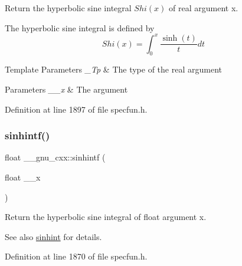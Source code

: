 Return the hyperbolic sine integral $ Shi(x) $ of real argument {\ttfamily x}.

The hyperbolic sine integral is defined by \[ Shi(x) = \int_0^x \frac{\sinh(t)}{t}dt \]


\begin{DoxyTemplParams}{Template Parameters}
{\em \+\_\+\+Tp} & The type of the real argument \\
\hline
\end{DoxyTemplParams}

\begin{DoxyParams}{Parameters}
{\em \+\_\+\+\_\+x} & The argument \\
\hline
\end{DoxyParams}


Definition at line 1897 of file specfun.\+h.

\mbox{\label{group__mathsf__gnu_ga375ca3ceb1eafd678e298d0aea4bb3e6}} 
\subsubsection{\texorpdfstring{sinhintf()}{sinhintf()}}
{\footnotesize\ttfamily float \+\_\+\+\_\+gnu\+\_\+cxx\+::sinhintf (\begin{DoxyParamCaption}\item[{float}]{\+\_\+\+\_\+x }\end{DoxyParamCaption})\hspace{0.3cm}{\ttfamily [inline]}}

Return the hyperbolic sine integral of {\ttfamily float} argument {\ttfamily x}.

\begin{DoxySeeAlso}{See also}
\hyperlink{group__mathsf__gnu_gab5cbc831c5fab99a967c03d059f1ad59}{sinhint} for details. 
\end{DoxySeeAlso}


Definition at line 1870 of file specfun.\+h.

\mbox{\label{group__mathsf__gnu_ga8b7f1a070be7233a3179e3cbded387ee}} 
